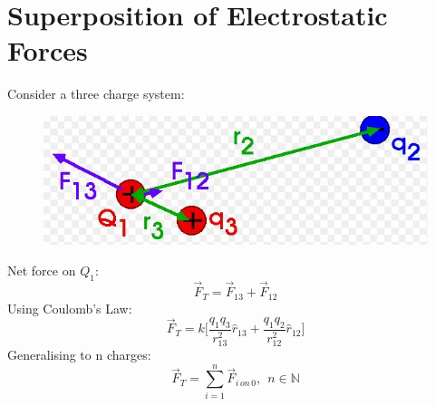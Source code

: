 \documentclass[a4paper, 11pt, normalem]{report}
\begin{document}
\section{Superposition of Electrostatic Forces}
Consider a three charge system:
\begin{figure}[H]
    \centering
    \includegraphics{3Force.JPG}
\end{figure}
Net force on $Q_{1}$:
\begin{equation}
    \vec{F}_{T} = \vec{F}_{13} + \vec{F}_{12}
\end{equation}
Using Coulomb's Law:
\begin{equation}
    \vec{F}_{T} = k\Big[\frac{q_{1}q_{3}}{r_{13}^{2}}\hat{r}_{13} + \frac{q_{1}q_{2}}{r_{12}^{2}}\hat{r}_{12}\Big]
\end{equation}
Generalising to n charges:
\begin{equation}
    \vec{F}_{T} = \sum_{i = 1}^{n} \vec{F}_{i\,on\,0},~~n \in \mathbb{N}
\end{equation}
\end{document}
